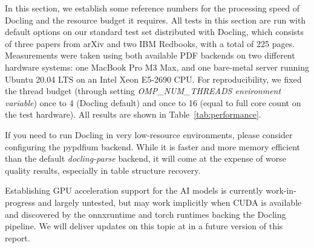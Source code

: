 \documentclass{article}
\begin{document}
In this section, we establish some reference numbers for the processing speed of Docling and the resource budget it requires. All tests in this section are run with default options on our standard test set distributed with Docling, which consists of three papers from arXiv and two IBM Redbooks, with a total of 225 pages. Measurements were taken using both available PDF backends on two different hardware systems: one MacBook Pro M3 Max, and one bare-metal server running Ubuntu 20.04 LTS on an Intel Xeon E5-2690 CPU. For reproducibility, we fixed the thread budget (through setting \textit{OMP\_NUM\_THREADS environment variable}) once to 4 (Docling default) and once to 16 (equal to full core count on the test hardware). All results are shown in Table~\ref{tab:performance}.

If you need to run Docling in very low-resource environments, please consider configuring the pypdfium backend. While it is faster and more memory efficient than the default \textit{docling-parse} backend, it will come at the expense of worse quality results, especially in table structure recovery.

Establishing GPU acceleration support for the AI models is currently work-in-progress and largely untested, but may work implicitly when CUDA is available and discovered by the onnxruntime and torch runtimes backing the Docling pipeline. We will deliver updates on this topic at in a future version of this report. 
\end{document}
